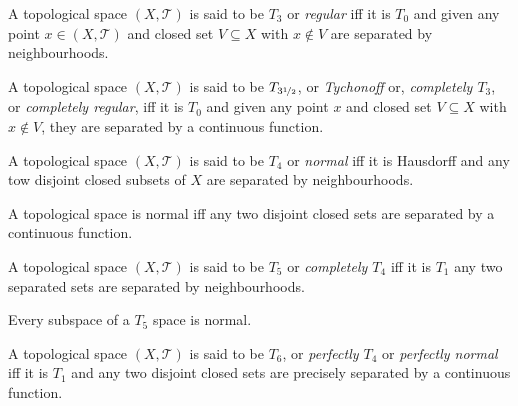 \begin{definition}
	[$T_3$ spaces]
	\label{def: T_3 spaces}
	A topological space $(X, \mathcal T)$ is said to be $T_3$ or \textit{regular} iff it is $T_0$ and given any point $x \in (X, \mathcal T)$ and closed set $V \subseteq X$ with $x \notin V$ are separated by neighbourhoods.
\end{definition}


\begin{definition}
	\label{def: T_3.5 spaces}
	A topological space $(X, \mathcal T)$ is said to be $T_{3 \nicefrac{1}{2}}$, or \textit{Tychonoff} or, \textit{completely $T_3$}, or \textit{completely regular}, iff it is $T_0$ and given any point $x$ and closed set $V \subseteq X$ with $x \notin V$, they are separated by a continuous function.
\end{definition}


\begin{definition}
	[$T_4$ spaces]
	\label{def: T_4 spaces}
	A topological space $(X, \mathcal T)$ is said to be $T_4$ or \textit{normal} iff it is Hausdorff and any tow disjoint closed subsets of $X$ are separated by neighbourhoods.
\end{definition}


\begin{proposition}
	\label{prop: urysohn's lemma}
	A topological space is normal iff any two disjoint closed sets are separated by a continuous function.
\end{proposition}


\begin{definition}
	[$T_5$ spaces]
	\label{def: T_5 spaces}
	A topological space $(X, \mathcal T)$ is said to be $T_5$ or \textit{completely $T_4$} iff it is $T_1$ any two separated sets are separated by neighbourhoods.
\end{definition}


\begin{proposition}
	Every subspace of a $T_5$ space is normal.
\end{proposition}


\begin{definition}
	[$T_6$ spaces]
	\label{def: T_6 spaces}
	A topological space $(X, \mathcal T)$ is said to be $T_6$, or \textit{perfectly $T_4$} or \textit{perfectly normal} iff it is $T_1$ and any two disjoint closed sets are precisely separated by a continuous function.
\end{definition}



